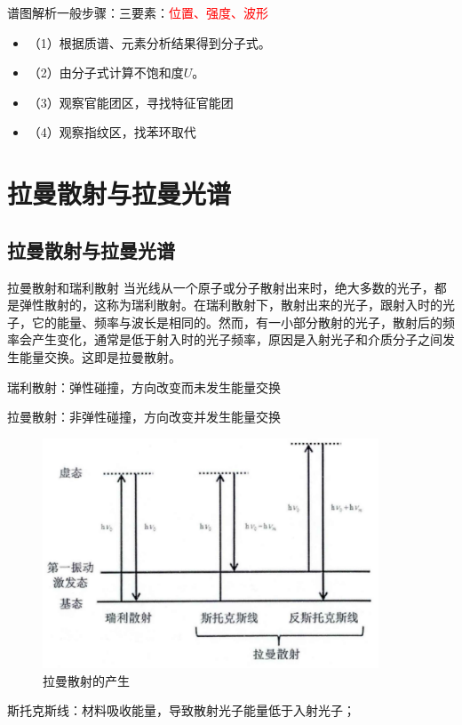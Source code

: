 \begin{note}
    谱图解析一般步骤：三要素：\textcolor{red}{位置、强度、波形}
    \begin{itemize}
        \item （1）根据质谱、元素分析结果得到分子式。
        \item （2）由分子式计算不饱和度$U$。
        \item （3）观察官能团区，寻找特征官能团
        \item （4）观察指纹区，找苯环取代
    \end{itemize}
\end{note}

\section{拉曼散射与拉曼光谱}
\subsection{拉曼散射与拉曼光谱}
\begin{definition*}{拉曼散射和瑞利散射}
	当光线从一个原子或分子散射出来时，绝大多数的光子，都是弹性散射的，这称为瑞利散射。在瑞利散射下，散射出来的光子，跟射入时的光子，它的能量、频率与波长是相同的。然而，有一小部分散射的光子，散射后的频率会产生变化，通常是低于射入时的光子频率，原因是入射光子和介质分子之间发生能量交换。这即是拉曼散射。
\end{definition*}
\begin{note}
	瑞利散射：弹性碰撞，方向改变而未发生能量交换
	
	拉曼散射：非弹性碰撞，方向改变并发生能量交换
\end{note}
\begin{figure}[ht]
	\centering
	\includegraphics[width=10cm]{image/chp5_sers.png}
	\caption{拉曼散射的产生}
	\label{fig:chp5_laman}
\end{figure}
斯托克斯线：材料吸收能量，导致散射光子能量低于入射光子；

